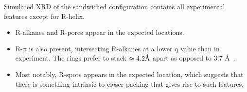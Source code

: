 \documentclass{article}
\newcommand{\angstrom}{\textup{\AA}}
\begin{document}
  Simulated XRD of the sandwiched configuration contains all experimental features
  except for R-helix.
  \begin{itemize}
        \item R-alkanes and R-pores appear in the expected locations.
        \item R-$\pi$ is also present, intersecting R-alkanes at a lower q value than
        in experiment. The rings prefer to stack $\approx 4.2 \angstrom$ apart as %
        opposed to 3.7 \angstrom~.
        \item Most notably, R-spots appears in the expected location, which suggests 
        that there is something intrinsic to closer packing that gives rise 
        to such features. 
  \end{itemize}

\end{document}
